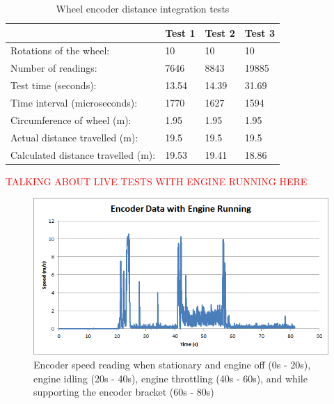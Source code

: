 \documentclass[main.tex]{subfiles}
\begin{document}
\begin{table}[ht]
\centering
\caption{Wheel encoder distance integration tests}
\label{encoderIntegration}
\begin{tabular}{l|l|l|l}
                                   & Test 1 & Test 2 & Test 3 \\ \hline
Rotations of the wheel:            & 10     & 10     & 10     \\
Number of readings:                & 7646   & 8843   & 19885  \\
Test time (seconds):               & 13.54  & 14.39  & 31.69  \\
Time interval (microseconds):      & 1770   & 1627   & 1594   \\
Circumference of wheel (m):        & 1.95   & 1.95   & 1.95   \\
Actual distance travelled (m):     & 19.5   & 19.5   & 19.5   \\
Calculated distance travelled (m): & 19.53  & 19.41  & 18.86  \\
\end{tabular}
\end{table}

\textcolor{red}{TALKING ABOUT LIVE TESTS WITH ENGINE RUNNING HERE}

\begin{figure}[ht]
\includegraphics[width=1\textwidth]{5-Testing/Encoder_data_with_engine_running.png}
\centering
\caption{Encoder speed reading when stationary and engine off (0s - 20s), engine idling (20s - 40s), engine throttling (40s - 60s), and while supporting the encoder bracket (60s - 80s)}
\end{figure}
\end{document}
